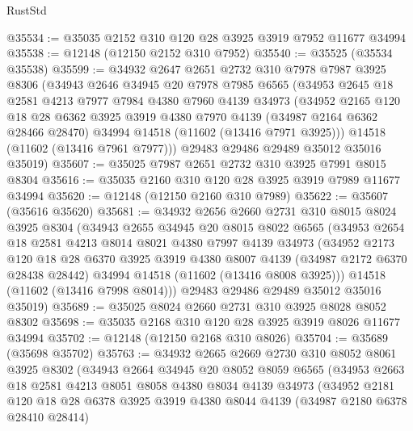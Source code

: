\begin{lexlean}{RustStd}
\begin{coremodule}
@35534 := @35035 @2152 @310 @120 @28 @3925 @3919 @7952 @11677 @34994
@35538 := @12148 (@12150 @2152 @310 @7952)
@35540 := @35525 (@35534 @35538)
@35599 := @34932
    @2647
    @2651
    @2732
    @310
    @7978
    @7987
    @3925
    @8306
    (@34943
      @2646
      @34945
      @20
      @7978
      @7985
      @6565
      (@34953
        @2645
        @18
        @2581
        @4213
        @7977
        @7984
        @4380
        @7960
        @4139
        @34973
        (@34952
          @2165
          @120
          @18
          @28
          @6362
          @3925
          @3919
          @4380
          @7970
          @4139
          (@34987 @2164 @6362 @28466 @28470)
          @34994
          @14518
          (@11602 (@13416 @7971 @3925)))
        @14518
        (@11602 (@13416 @7961 @7977)))
      @29483
      @29486
      @29489
      @35012
      @35016
      @35019)
@35607 := @35025 @7987 @2651 @2732 @310 @3925 @7991 @8015 @8304
@35616 := @35035 @2160 @310 @120 @28 @3925 @3919 @7989 @11677 @34994
@35620 := @12148 (@12150 @2160 @310 @7989)
@35622 := @35607 (@35616 @35620)
@35681 := @34932
    @2656
    @2660
    @2731
    @310
    @8015
    @8024
    @3925
    @8304
    (@34943
      @2655
      @34945
      @20
      @8015
      @8022
      @6565
      (@34953
        @2654
        @18
        @2581
        @4213
        @8014
        @8021
        @4380
        @7997
        @4139
        @34973
        (@34952
          @2173
          @120
          @18
          @28
          @6370
          @3925
          @3919
          @4380
          @8007
          @4139
          (@34987 @2172 @6370 @28438 @28442)
          @34994
          @14518
          (@11602 (@13416 @8008 @3925)))
        @14518
        (@11602 (@13416 @7998 @8014)))
      @29483
      @29486
      @29489
      @35012
      @35016
      @35019)
@35689 := @35025 @8024 @2660 @2731 @310 @3925 @8028 @8052 @8302
@35698 := @35035 @2168 @310 @120 @28 @3925 @3919 @8026 @11677 @34994
@35702 := @12148 (@12150 @2168 @310 @8026)
@35704 := @35689 (@35698 @35702)
@35763 := @34932
    @2665
    @2669
    @2730
    @310
    @8052
    @8061
    @3925
    @8302
    (@34943
      @2664
      @34945
      @20
      @8052
      @8059
      @6565
      (@34953
        @2663
        @18
        @2581
        @4213
        @8051
        @8058
        @4380
        @8034
        @4139
        @34973
        (@34952
          @2181
          @120
          @18
          @28
          @6378
          @3925
          @3919
          @4380
          @8044
          @4139
          (@34987 @2180 @6378 @28410 @28414)

\end{coremodule}
\end{lexlean}
